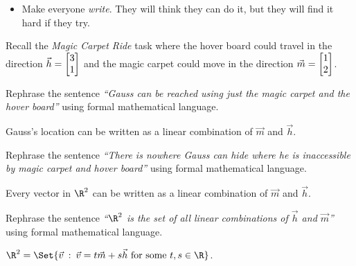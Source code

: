 	\bookonlynewpage
	\question
	\begin{annotation}
		\begin{goals}
		\end{goals}

		\begin{notes}
			\begin{itemize}
				\item Make everyone \emph{write}. They will think
					they can do it, but they will find it hard if
					they try.
			\end{itemize}
		\end{notes}
	\end{annotation}
	Recall the \emph{Magic Carpet Ride} task where the hover board could
	travel in the direction $\vec h=\mat{3\\1}$ and the magic carpet could
	move in the direction $\vec m=\mat{1\\2}$.
	\begin{parts}
		\item Rephrase the sentence \emph{``Gauss can be reached using just the
			magic carpet and the hover board''} using formal mathematical
			language.
			\begin{solution}
				Gauss's location can be written as a linear combination of
				$\vec m$ and $\vec h$.
			\end{solution}
		\item Rephrase the sentence \emph{``There is nowhere Gauss can hide
			where he is inaccessible by magic carpet and hover board''} using
			formal mathematical language.
			\begin{solution}
				Every vector in $\R^2$ can be written as a linear combination
				of $\vec m$ and	$\vec h$.
			\end{solution}
		\item Rephrase the sentence \emph{``$\R^2$ is the set of all linear
			combinations of $\vec h$ and $\vec m$''} using formal mathematical
			language.
			\begin{solution}
				$\R^2=\Set{\vec v\given \vec v=t\vec m+s\vec h\text{ for some }t,s\in \R}$.
			\end{solution}
	\end{parts}

